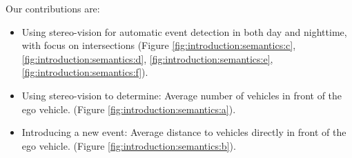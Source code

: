 \vspace*{-3mm}
Our contributions are:
\begin{itemize}
\item Using stereo-vision for automatic event detection in both day and nighttime, with focus on intersections (Figure \ref{fig:introduction:semantics:c}, \ref{fig:introduction:semantics:d}, \ref{fig:introduction:semantics:e}, \ref{fig:introduction:semantics:f}).
\item Using stereo-vision to determine: Average number of vehicles in front of the ego vehicle. (Figure \ref{fig:introduction:semantics:a}).
\item Introducing a new event: Average distance to vehicles directly in front of the ego vehicle. (Figure \ref{fig:introduction:semantics:b}).
\end{itemize}

